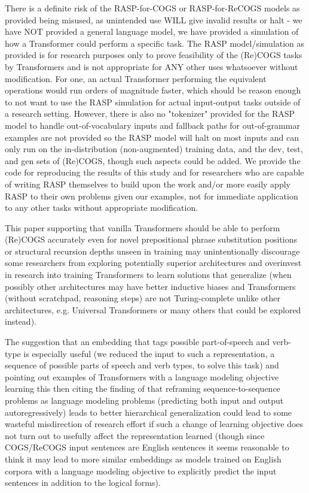 \documentclass[11pt]{article}
\begin{document}
There is a definite risk of the RASP-for-COGS or RASP-for-ReCOGS models as provided being misused, as unintended use WILL give invalid results or halt - we have NOT provided a general language model, we have provided a simulation of how a Transformer could perform a specific task.
The RASP model/simulation as provided is for research purposes only to prove feasibility of the (Re)COGS tasks by Transformers and is not appropriate for ANY other uses whatsoever without modification. For one, an actual Transformer performing the equivalent operations would run orders of magnitude faster, which should be reason enough to not want to use the RASP simulation for actual input-output tasks outside of a research setting. However, there is also no "tokenizer" provided for the RASP model to handle out-of-vocabulary inputs and fallback paths for out-of-grammar examples are not provided so the RASP model will halt on most inputs and can only run on the in-distribution (non-augmented) training data, and the dev, test, and gen sets of (Re)COGS, though such aspects could be added. We provide the code for reproducing the results of this study and for researchers who are capable of writing RASP themselves to build upon the work and/or more easily apply RASP to their own problems given our examples, not for immediate application to any other tasks without appropriate modification.

This paper supporting that vanilla Transformers should be able to perform (Re)COGS accurately even for novel prepositional phrase substitution positions or structural recursion depths unseen in training may unintentionally discourage some researchers from exploring potentially superior architectures and overinvest in research into training Transformers to learn solutions that generalize (when possibly other architectures may have better inductive biases and Transformers (without scratchpad, reasoning steps) are not Turing-complete \citep{merrill2024expressivepowertransformerschain} \citep{delétang2023neuralnetworkschomskyhierarchy} \citep{Strobl2024} unlike other architectures, e.g. Universal Transformers \citep{Dehghani2019} or many others that could be explored instead).

The suggestion that an embedding that tags possible part-of-speech and verb-type is especially useful (we reduced the input to such a representation, a sequence of possible parts of speech and verb types, to solve this task) and pointing out examples of Transformers with a language modeling objective learning this \citep{tenney2019bertrediscoversclassicalnlp} then citing the finding of \citep{10.1162/tacl_a_00733} that reframing sequence-to-sequence problems as language modeling problems (predicting both input and output autoregressively) leads to better hierarchical generalization could lead to some wasteful misdirection of research effort if such a change of learning objective does not turn out to usefully affect the representation learned (though since COGS/ReCOGS input sentences are English sentences it seems reasonable to think it may lead to more similar embeddings as models trained on English corpora with a language modeling objective to explicitly predict the input sentences in addition to the logical forms).
\end{document}
